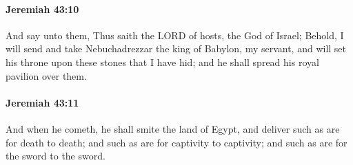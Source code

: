 		\paragraph{Jeremiah 43:10} %
			\label{JEREMIAH-43-10}

			And say unto them, Thus saith the LORD of hosts, the God of Israel; Behold, I will send and take Nebuchadrezzar the king of Babylon, my servant, and will set his throne upon these stones that I have hid; and he shall spread his royal pavilion over them.


		\paragraph{Jeremiah 43:11} %
			\label{JEREMIAH-43-11}

			And when he cometh, he shall smite the land of Egypt, and deliver such as are for death to death; and such as are for captivity to captivity; and such as are for the sword to the sword.

